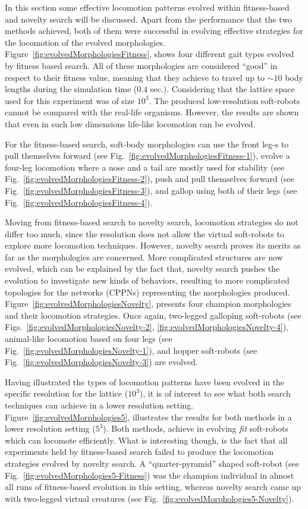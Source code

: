 In this section some effective locomotion patterns evolved within fitness-based and novelty search will be discussed. Apart from the performance that the two methods achieved, both of them were successful in evolving effective strategies for the locomotion of the evolved morphologies. Figure~\ref{fig:evolvedMorphologiesFitness}, shows four different gait types evolved by fitness based search. All of these morphologies are considered ``good'' in respect to their fitness value, meaning that they achieve to travel up to $\sim 10$ body lengths during the simulation time ($0.4$ sec.). Considering that the lattice space used for this experiment was of size $10^3$. The produced low-resolution soft-robots cannot be compared with the real-life organisms. However, the results are shown that even in such low dimensions life-like locomotion can be evolved. 

For the fitness-based search, soft-body morphologies can use the front leg-s to pull themselves forward (see Fig.~\ref{fig:evolvedMorphologiesFitness-1}), evolve a four-leg locomotion where a nose and a tail are mostly used for stability (see Fig.~\ref{fig:evolvedMorphologiesFitness-2}), push and pull themselves forward (see Fig.~\ref{fig:evolvedMorphologiesFitness-3}), and gallop using both of their legs (see Fig.~\ref{fig:evolvedMorphologiesFitness-4}). 

Moving from fitness-based search to novelty search, locomotion strategies do not differ too much, since the resolution does not allow the virtual soft-robots to explore more locomotion techniques. However, novelty search proves its merits as far as the morphologies are concerned. More complicated structures are now evolved, which can be explained by the fact that, novelty search pushes the evolution to investigate new kinds of behaviors, resulting to more complicated topologies for the networks (CPPNs) representing the morphologies produced. Figure~\ref{fig:evolvedMorphologiesNovelty}, presents four champion morphologies and their locomotion strategies. Once again, two-legged galloping soft-robots (see Figs.~\ref{fig:evolvedMorphologiesNovelty-2}, \ref{fig:evolvedMorphologiesNovelty-4}), animal-like locomotion based on four legs (see Fig.~\ref{fig:evolvedMorphologiesNovelty-1}), and hopper soft-robots (see Fig.~\ref{fig:evolvedMorphologiesNovelty-3}) are evolved.

Having illustrated the types of locomotion patterns have been evolved in the specific resolution for the lattice ($10^3$), it is of interest to see what both search techniques can achieve in a lower resolution setting. Figure~\ref{fig:evolvedMorphologies5}, illustrates the results for both methods in a lower resolution setting ($5^3$). Both methods, achieve in evolving \emph{fit} soft-robots which can locomote efficiently. What is interesting though, is the fact that all experiments held by fitness-based search failed to produce the locomotion strategies evolved by novelty search. A ``quarter-pyramid'' shaped soft-robot (see Fig.~\ref{fig:evolvedMorphologies5-Fitness}) was the champion individual in almost all runs of fitness-based evolution in this setting, whereas novelty search came up with two-legged virtual creatures (see Fig.~\ref{fig:evolvedMorphologies5-Novelty}).


